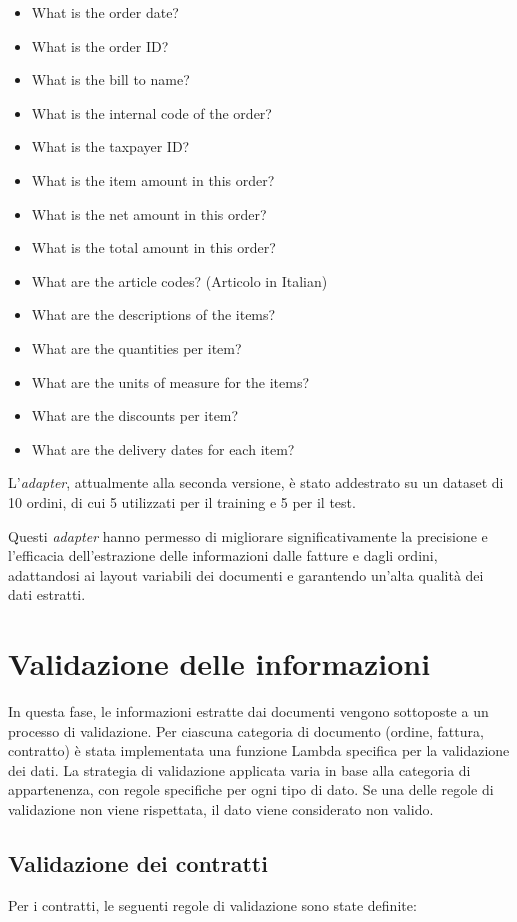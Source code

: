 \begin{itemize}
    \item What is the order date?
    \item What is the order ID?
    \item What is the bill to name?
    \item What is the internal code of the order?
    \item What is the taxpayer ID?
    \item What is the item amount in this order?
    \item What is the net amount in this order?
    \item What is the total amount in this order?
    \item What are the article codes? (Articolo in Italian)
    \item What are the descriptions of the items?
    \item What are the quantities per item?
    \item What are the units of measure for the items?
    \item What are the discounts per item?
    \item What are the delivery dates for each item?
\end{itemize}

L'\textit{adapter}, attualmente alla seconda versione, è stato addestrato su un dataset di 10 ordini, di cui 5 utilizzati per il training e 5 per il test.

Questi \textit{adapter} hanno permesso di migliorare significativamente la precisione e l'efficacia dell'estrazione delle informazioni dalle fatture e dagli ordini, adattandosi ai layout variabili dei documenti e garantendo un'alta qualità dei dati estratti.
\section{Validazione delle informazioni}
In questa fase, le informazioni estratte dai documenti vengono sottoposte a un processo di validazione. Per ciascuna categoria di documento (ordine, fattura, contratto) è stata implementata una funzione Lambda specifica per la validazione dei dati. La strategia di validazione applicata varia in base alla categoria di appartenenza, con regole specifiche per ogni tipo di dato. Se una delle regole di validazione non viene rispettata, il dato viene considerato non valido.

\subsection{Validazione dei contratti}
\label{subsec:validazione-contratti}
Per i contratti, le seguenti regole di validazione sono state definite:

